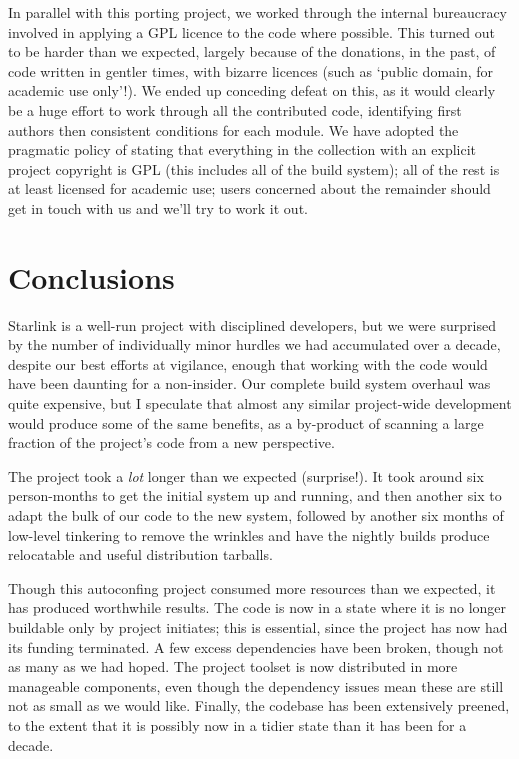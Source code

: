 \documentclass{speauth}
\begin{document}
In parallel with this porting project, we worked through the internal
bureaucracy involved in applying a GPL licence to the code where
possible.  This turned out to be harder than we expected, largely
because of the donations, in the past, of code written in gentler
times, with bizarre licences (such as `public domain, for academic use
only'!).  We ended up conceding defeat on this, as it would clearly be
a huge effort to work through all the contributed code, identifying
first authors then consistent conditions for each module.  We have
adopted the pragmatic policy of stating that everything in the
collection with an explicit project copyright is GPL (this includes
all of the build system); all of the rest is at least licensed for
academic use; users concerned about the remainder should get in touch
with us and we'll try to work it out.

\section{Conclusions}

Starlink is a well-run project with disciplined developers, but we
were surprised by the number of individually minor hurdles we had
accumulated over a decade, despite our best efforts at vigilance,
enough that working with
the code would have been daunting for a non-insider.  Our complete
build system overhaul was quite expensive, but I speculate that almost
any similar project-wide development would produce some of the same
benefits, as a by-product of scanning a large fraction of the
project's code from a new perspective.

The project took a \emph{lot} longer than we expected (surprise!).  It
took around six person-months to get the initial system up and
running, and then another six to adapt the bulk of our code to the new
system, followed by another six months of low-level tinkering to
remove the wrinkles and have the nightly builds produce relocatable
and useful distribution tarballs.

Though this autoconfing project consumed more resources than we
expected, it has produced worthwhile results.  The code is now in a
state where it is no longer buildable only by project initiates; this
is essential, since the project has now had its funding terminated.  A
few excess dependencies have been broken, though not as many as we had hoped.
The project toolset is now distributed in more manageable components,
even though the dependency issues mean these are still not as small as
we would like.  Finally, the codebase has been extensively preened, to the
extent that it is possibly now in a tidier state than it has been for
a decade.
\end{document}
